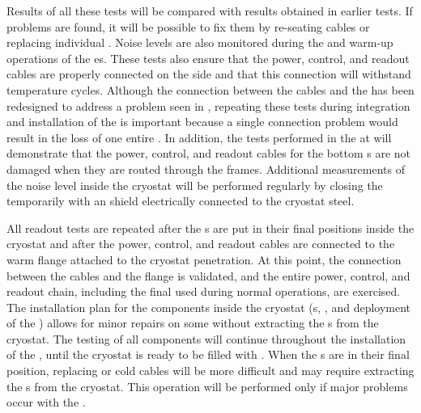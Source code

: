 Results of all these tests will be compared with results obtained 
in earlier  tests.  If problems are found, it will be possible 
to fix them by re-seating cables or replacing individual .
Noise levels are also monitored during the \cooldown and warm-up 
operations of the \coldbox{}es. These tests also ensure that the power,
control, and readout cables are properly connected
on the  side and that this connection will withstand temperature 
cycles. 
Although the connection between the cables and the 
has been redesigned to address a problem %
seen in , repeating these tests during integration
and installation of the  is important because a single connection problem would
result in the loss of one entire . In addition, the tests 
performed in the \coldbox at  will demonstrate that the power, control, and
readout cables for the bottom s are not damaged when they are routed 
through the  frames. Additional measurements of the noise
level inside the cryostat will be performed regularly by closing 
the  temporarily with an  shield electrically connected 
to the cryostat steel. 

All readout tests are repeated after the s are put
in their final positions inside the cryostat and after the power, control, and
readout cables are connected to the warm flange attached to the cryostat
penetration. At this point, the connection between the cables and the flange
is validated, and the entire power, control, and readout chain, including the
final  used during normal operations, are exercised. The
installation plan for the  components inside the cryostat (s,
, and deployment of the ) allows for minor repairs on some  without extracting
the s from the cryostat. The testing of all  components
will continue throughout the installation of %
the , 
until the cryostat is ready to be filled with .  When the 
s are in their final position, replacing  
or cold cables will be more difficult and may require extracting the s 
from the cryostat. This operation will be performed only if major problems occur with the .

